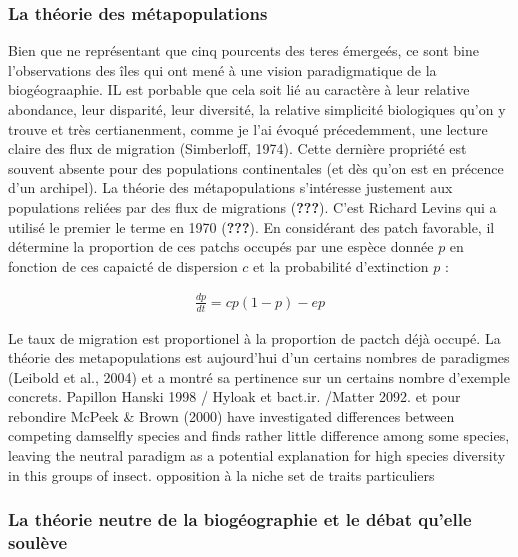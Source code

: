 \subsubsection*{La théorie des
métapopulations}\label{la-thuxe9orie-des-muxe9tapopulations}

Bien que ne représentant que cinq pourcents des teres émergeés, ce sont
bine l'observations des îles qui ont mené à une vision paradigmatique de
la biogéograaphie. IL est porbable que cela soit lié au caractère à leur
relative abondance, leur disparité, leur diversité, la relative
simplicité biologiques qu'on y trouve et très certianenment, comme je
l'ai évoqué précedemment, une lecture claire des flux de migration
(Simberloff, 1974). Cette dernière propriété est souvent absente pour
des populations continentales (et dès qu'on est en précence d'un
archipel). La théorie des métapopulations s'intéresse justement aux
populations reliées par des flux de migrations ({\textbf{???}}). C'est
Richard Levins qui a utilisé le premier le terme en 1970
({\textbf{???}}). En considérant des patch favorable, il détermine la
proportion de ces patchs occupés par une espèce donnée \(p\) en fonction
de ces capaicté de dispersion \(c\) et la probabilité d'extinction \(p\)
:

\begin{eqnarray}
\label{eqMW}
\frac{dp}{dt} = cp(1-p)-ep
\end{eqnarray}

Le taux de migration est proportionel à la proportion de pactch déjà
occupé. La théorie des metapopulations est aujourd'hui d'un certains
nombres de paradigmes (Leibold et al., 2004) et a montré sa pertinence
sur un certains nombre d'exemple concrets. Papillon Hanski 1998 / Hyloak
et bact.ir. /Matter 2092. et pour rebondire McPeek \& Brown (2000) have
investigated differences between competing damselfly species and finds
rather little difference among some species, leaving the neutral
paradigm as a potential explanation for high species diversity in this
groups of insect. opposition à la niche set de traits particuliers

\subsubsection*{La théorie neutre de la biogéographie et le débat
qu'elle
soulève}\label{la-thuxe9orie-neutre-de-la-bioguxe9ographie-et-le-duxe9bat-quelle-souluxe8ve}

